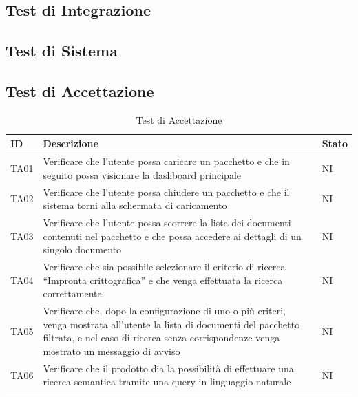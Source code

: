 \documentclass[a4paper,12pt]{article}
\begin{document}
        \subsection{Test di Integrazione}

        \subsection{Test di Sistema}

        \subsection{Test di Accettazione}
        \begin{longtable}{|M{1.5cm}|M{8.5cm}|M{2cm}|}

                \caption{Test di Accettazione} \\
                \hline
                \textbf{ID} & \textbf{Descrizione} & \textbf{Stato} \\
                \hline
                \endhead

                TA01 & Verificare che l'utente possa caricare un pacchetto e che in seguito possa visionare la dashboard principale & NI \\
                \hline
                
                TA02 & Verificare che l'utente possa chiudere un pacchetto e che il sistema torni alla schermata di caricamento & NI \\
                \hline

                TA03 & Verificare che l’utente possa scorrere la lista dei documenti contenuti nel pacchetto e che possa accedere ai dettagli di un singolo documento & NI \\
                \hline
                
                TA04 & Verificare che sia possibile selezionare il criterio di ricerca “Impronta crittografica” e che venga effettuata la ricerca correttamente & NI \\
                \hline

                TA05 & Verificare che, dopo la configurazione di uno o più criteri, venga mostrata all'utente la lista di documenti del pacchetto filtrata, e nel caso di ricerca senza corrispondenze venga mostrato un messaggio di avviso & NI \\
                \hline
                
                TA06 & Verificare che il prodotto dia la possibilità di effettuare una ricerca semantica tramite una query in linguaggio naturale & NI \\
                \hline


\end{longtable}
\end{document}

